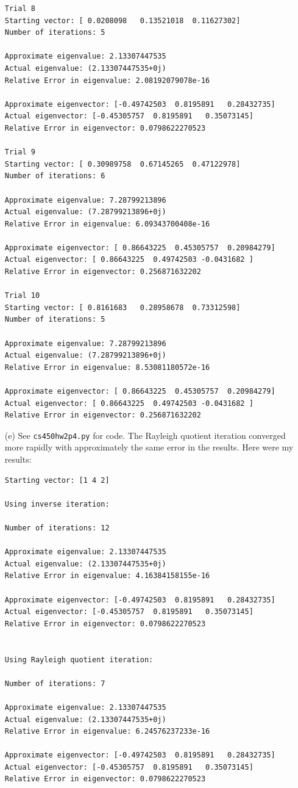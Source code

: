 \documentclass[10pt]{article}
\begin{document}
\begin{itemize}
\begin{verbatim}
Trial 8
Starting vector: [ 0.0208098   0.13521018  0.11627302]
Number of iterations: 5

Approximate eigenvalue: 2.13307447535
Actual eigenvalue: (2.13307447535+0j)
Relative Error in eigenvalue: 2.08192079078e-16

Approximate eigenvector: [-0.49742503  0.8195891   0.28432735]
Actual eigenvector: [-0.45305757  0.8195891   0.35073145]
Relative Error in eigenvector: 0.0798622270523

Trial 9
Starting vector: [ 0.30989758  0.67145265  0.47122978]
Number of iterations: 6

Approximate eigenvalue: 7.28799213896
Actual eigenvalue: (7.28799213896+0j)
Relative Error in eigenvalue: 6.09343700408e-16

Approximate eigenvector: [ 0.86643225  0.45305757  0.20984279]
Actual eigenvector: [ 0.86643225  0.49742503 -0.0431682 ]
Relative Error in eigenvector: 0.256871632202

Trial 10
Starting vector: [ 0.8161683   0.28958678  0.73312598]
Number of iterations: 5

Approximate eigenvalue: 7.28799213896
Actual eigenvalue: (7.28799213896+0j)
Relative Error in eigenvalue: 8.53081180572e-16

Approximate eigenvector: [ 0.86643225  0.45305757  0.20984279]
Actual eigenvector: [ 0.86643225  0.49742503 -0.0431682 ]
Relative Error in eigenvector: 0.256871632202
\end{verbatim}

\item[(e)] See \verb+cs450hw2p4.py+ for code. The Rayleigh quotient iteration converged more rapidly with approximately the same error in the results. Here were my results:

\begin{verbatim}
Starting vector: [1 4 2]

Using inverse iteration:

Number of iterations: 12

Approximate eigenvalue: 2.13307447535
Actual eigenvalue: (2.13307447535+0j)
Relative Error in eigenvalue: 4.16384158155e-16

Approximate eigenvector: [-0.49742503  0.8195891   0.28432735]
Actual eigenvector: [-0.45305757  0.8195891   0.35073145]
Relative Error in eigenvector: 0.0798622270523


Using Rayleigh quotient iteration:

Number of iterations: 7

Approximate eigenvalue: 2.13307447535
Actual eigenvalue: (2.13307447535+0j)
Relative Error in eigenvalue: 6.24576237233e-16

Approximate eigenvector: [-0.49742503  0.8195891   0.28432735]
Actual eigenvector: [-0.45305757  0.8195891   0.35073145]
Relative Error in eigenvector: 0.0798622270523
\end{verbatim}



\end{itemize}
\end{document}
